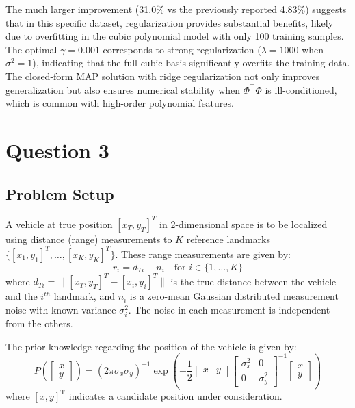 \documentclass[12pt]{article}
\begin{document}
The much larger improvement (31.0\% vs the previously reported 4.83\%) suggests that in this specific dataset, regularization provides substantial benefits, likely due to overfitting in the cubic polynomial model with only 100 training samples. The optimal $\gamma=0.001$ corresponds to strong regularization ($\lambda=1000$ when $\sigma^2=1$), indicating that the full cubic basis significantly overfits the training data.\\

The closed-form MAP solution with ridge regularization not only improves generalization but also ensures numerical stability when $\Phi^\top\Phi$ is ill-conditioned, which is common with high-order polynomial features.



\newpage
\section{Question 3}

\subsection{Problem Setup}
A vehicle at true position $[x_T, y_T]^T$ in 2-dimensional space is to be localized using distance (range) measurements to $K$ reference landmarks $\{[x_1, y_1]^T, \ldots, [x_K, y_K]^T\}$. These range measurements are given by:
\[
r_i = d_{Ti} + n_i \quad \text{for } i \in \{1, \ldots, K\}
\]
where $d_{Ti} = \|[x_T, y_T]^T - [x_i, y_i]^T\|$ is the true distance between the vehicle and the $i^{th}$ landmark, and $n_i$ is a zero-mean Gaussian distributed measurement noise with known variance $\sigma_i^2$. The noise in each measurement is independent from the others.

The prior knowledge regarding the position of the vehicle is given by:
\[
P\left(\begin{bmatrix}x\\ y\end{bmatrix}\right) = (2\pi\sigma_x\sigma_y)^{-1} \exp\left(-\frac{1}{2}\begin{bmatrix}x & y\end{bmatrix}\begin{bmatrix}\sigma_x^2 & 0\\ 0 & \sigma_y^2\end{bmatrix}^{-1}\begin{bmatrix}x\\ y\end{bmatrix}\right)
\]
where $[x, y]^{\mathrm{T}}$ indicates a candidate position under consideration.
\end{document}
